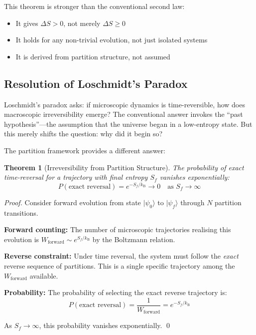 \documentclass[twocolumn,10pt,aps,prd,superscriptaddress,nofootinbib]{revtex4-2}
\newtheorem{theorem}{Theorem}[section]
\theoremstyle{remark}
\newcommand{\kB}{k_{\mathrm{B}}}
\begin{document}
This theorem is stronger than the conventional second law:
\begin{itemize}
\item It gives $\Delta S > 0$, not merely $\Delta S \geq 0$
\item It holds for any non-trivial evolution, not just isolated systems
\item It is derived from partition structure, not assumed
\end{itemize}

\subsection{Resolution of Loschmidt's Paradox}

Loschmidt's paradox asks: if microscopic dynamics is time-reversible, how does macroscopic irreversibility emerge? The conventional answer invokes the ``past hypothesis''---the assumption that the universe began in a low-entropy state. But this merely shifts the question: why did it begin so?

The partition framework provides a different answer:

\begin{theorem}[Irreversibility from Partition Structure]
\label{thm:irreversibility}
The probability of exact time-reversal for a trajectory with final entropy $S_f$ vanishes exponentially:
\begin{equation}
P(\text{exact reversal}) = e^{-S_f/\kB} \to 0 \quad \text{as } S_f \to \infty
\label{eq:irreversibility}
\end{equation}
\end{theorem}

\begin{proof}
Consider forward evolution from state $|\psi_0\rangle$ to $|\psi_f\rangle$ through $N$ partition transitions.

\textbf{Forward counting:} The number of microscopic trajectories realising this evolution is $W_{\text{forward}} \sim e^{S_f/\kB}$ by the Boltzmann relation.

\textbf{Reverse constraint:} Under time reversal, the system must follow the \emph{exact} reverse sequence of partitions. This is a single specific trajectory among the $W_{\text{forward}}$ available.

\textbf{Probability:} The probability of selecting the exact reverse trajectory is:
\begin{equation}
P(\text{exact reversal}) = \frac{1}{W_{\text{forward}}} = e^{-S_f/\kB}
\end{equation}

As $S_f \to \infty$, this probability vanishes exponentially. \qed
\end{proof}
\end{document}
